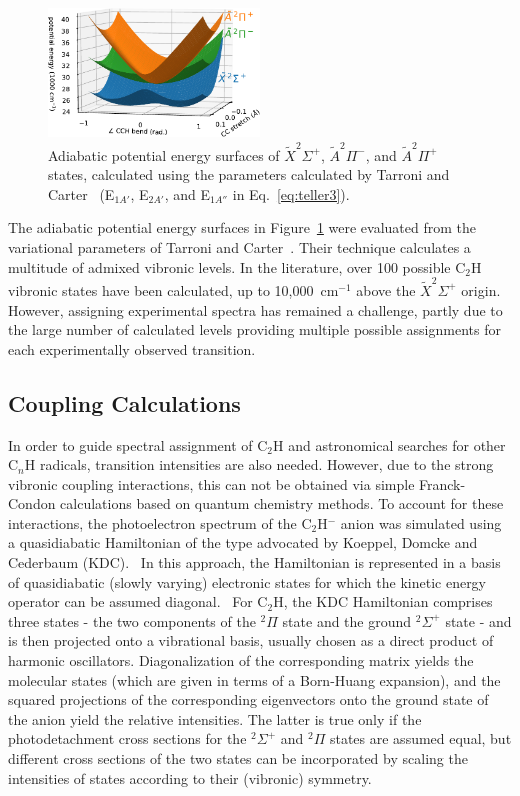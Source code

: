 \documentclass[journal=jpcafh,manuscript=article,layout=onecolumn, 12pt]{achemso}
\begin{document}
\begin{figure}
	\centering
	\includegraphics[width=0.5\textwidth]{figures/Fig3}
	\caption{Adiabatic potential energy surfaces of $\tilde{X}^2\Sigma^+$, $\tilde{A}^2\Pi^-$, and $\tilde{A}^2\Pi^+$ states, calculated using the parameters calculated by Tarroni and Carter~\cite{tar03} (E$_{1A'}$, E$_{2A'}$, and E$_{1A''}$ in Eq.~\ref{eq:teller3}).}
	\label{fig:2}
\end{figure}

The adiabatic potential energy surfaces in Figure~\ref{fig:2} were evaluated from the variational parameters of Tarroni and Carter~\cite{tar03}. Their technique calculates a multitude of admixed vibronic levels. In the literature, over 100 possible C$_2$H vibronic states have been calculated, up to 10,000~cm$^{-1}$ above the $\tilde{X} ^2\Sigma^+$ origin. However, assigning experimental spectra has remained a challenge, partly due to the large number of calculated levels providing multiple possible assignments for each experimentally observed transition.


\subsection{Coupling Calculations}
In order to guide spectral assignment of C$_2$H and astronomical searches for other C$_n$H radicals, transition intensities are also needed. However, due to the strong vibronic coupling interactions, this can not be obtained via simple Franck-Condon calculations based on quantum chemistry methods. To account for these interactions, the photoelectron spectrum of the C$_2$H$^-$ anion was simulated using a quasidiabatic Hamiltonian of the type advocated by Koeppel, Domcke and Cederbaum (KDC).~\cite{kou84,dom81} In this approach, the Hamiltonian is represented in a basis of quasidiabatic (slowly varying) electronic  states for which the kinetic energy operator can be assumed diagonal.~\cite{pac93} For C$_2$H, the KDC Hamiltonian comprises three states - the two components of the $^2\Pi$ state and the ground $^2\Sigma^+$ state - and is then projected onto a vibrational basis, usually chosen as a direct product of harmonic oscillators. Diagonalization of the corresponding matrix yields the molecular states (which are given in terms of a Born-Huang expansion), and the squared projections of the corresponding eigenvectors onto the ground state of the anion yield the relative intensities. The latter is true only if the photodetachment cross sections for the $^2\Sigma^+$ and $^2\Pi$ states are assumed equal, but different cross sections of the two states can be incorporated by scaling the intensities of states according to their (vibronic) symmetry.~\cite{sta11} 
\end{document}
